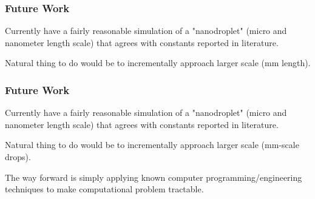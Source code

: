 \documentclass[12pt]{beamer}
\begin{document}
\begin{frame}
    \frametitle{Future Work}
    Currently have a fairly reasonable simulation of a "nanodroplet" (micro and
    nanometer length scale) that agrees with constants reported in literature.

    Natural thing to do would be to incrementally approach larger scale 
    (mm length).
\end{frame}
\begin{frame}
    \frametitle{Future Work}
    Currently have a fairly reasonable simulation of a "nanodroplet" (micro and
    nanometer length scale) that agrees with constants reported in literature.

    Natural thing to do would be to incrementally approach larger scale 
    (mm-scale drops).

    The way forward is simply applying known computer 
    programming/engineering techniques to make computational problem tractable.
\end{frame}
\end{document}
